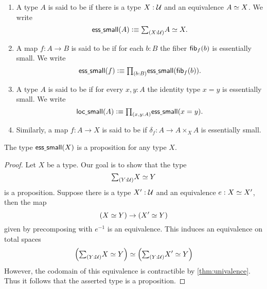 \begin{defn}
\begin{enumerate}
\item A type $A$ is said to be  if there is a type $X:\mathcal{U}$ and an equivalence $\eqv{A}{X}$. We write
\begin{equation*}
\esssmall(A)\defeq\sm{X:\UU}\eqv{A}{X}.
\end{equation*}
\item A map $f:A\to B$ is said to be  if for each $b:B$ the fiber $\mathsf{fib}_{f}(b)$ is essentially small.
We write
\begin{equation*}
\esssmall(f)\defeq\prd{b:B}\esssmall(\fib{f}{b}).
\end{equation*}
\item A type $A$ is said to be  if for every $x,y:A$ the identity type $x=y$ is essentially small.
We write
\begin{equation*}
\locsmall(A)\defeq \prd{x,y:A}\esssmall(x=y).
\end{equation*}
\item Similarly, a map $f:A\to X$ is said to be  if $\delta_f:A\to A\times_X A$ is essentially small.
\end{enumerate}
\end{defn}

\begin{lem}\label{lem:isprop_ess_small}
The type $\mathsf{ess\underline{\ }{}small}(X)$ is a proposition for any type $X$.
\end{lem}

\begin{proof}
Let $X$ be a type. Our goal is to show that the type
\begin{equation*}
\sm{Y:\UU}\eqv{X}{Y}
\end{equation*}
is a proposition. Suppose there is a type $X':\mathcal{U}$ and an equivalence $e:\eqv{X}{X'}$, then the map
\begin{equation*}
(\eqv{X}{Y})\to (\eqv{X'}{Y})
\end{equation*}
given by precomposing with $e^{-1}$ is an equivalence. This induces an equivalence on total spaces
\begin{equation*}
\eqv{\Big(\sm{Y:\UU}\eqv{X}{Y}\Big)}{\Big(\sm{Y:\UU}\eqv{X'}{Y}\Big)}
\end{equation*}
However, the codomain of this equivalence is contractible by \cref{thm:univalence}. Thus it follows that the asserted type is a proposition.
\end{proof}

